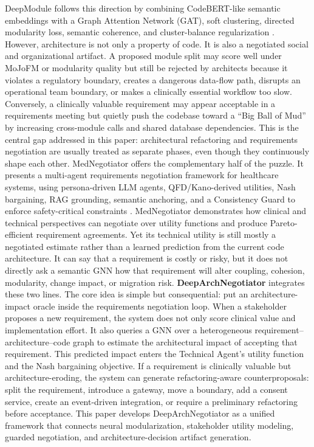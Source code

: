 \documentclass[english,preprint,nonatbib]{elsarticle}
\begin{document}
DeepModule follows this direction by combining CodeBERT-like semantic embeddings with a Graph Attention Network (GAT), soft clustering, directed modularity loss, semantic coherence, and cluster-balance regularization \cite{tanhaei2026deepmodule}.
However, architecture is not only a property of code. It is also a negotiated social and organizational artifact.
A proposed module split may score well under MoJoFM or modularity quality but still be rejected by architects because it violates a regulatory boundary, creates a dangerous data-flow path, disrupts an operational team boundary, or makes a clinically essential workflow too slow.
Conversely, a clinically valuable requirement may appear acceptable in a requirements meeting but quietly push the codebase toward a ``Big Ball of Mud'' by increasing cross-module calls and shared database dependencies.
This is the central gap addressed in this paper: architectural refactoring and requirements negotiation are usually treated as separate phases, even though they continuously shape each other.
MedNegotiator offers the complementary half of the puzzle.
It presents a multi-agent requirements negotiation framework for healthcare systems, using persona-driven LLM agents, QFD/Kano-derived utilities, Nash bargaining, RAG grounding, semantic anchoring, and a Consistency Guard to enforce safety-critical constraints \cite{tanhaei2026mednegotiator}.
MedNegotiator demonstrates how clinical and technical perspectives can negotiate over utility functions and produce Pareto-efficient requirement agreements.
Yet its technical utility is still mostly a negotiated estimate rather than a learned prediction from the current code architecture.
It can say that a requirement is costly or risky, but it does not directly ask a semantic GNN how that requirement will alter coupling, cohesion, modularity, change impact, or migration risk.
\textbf{DeepArchNegotiator} integrates these two lines. The core idea is simple but consequential: put an architecture-impact oracle inside the requirements negotiation loop.
When a stakeholder proposes a new requirement, the system does not only score clinical value and implementation effort.
It also queries a GNN over a heterogeneous requirement--architecture--code graph to estimate the architectural impact of accepting that requirement.
This predicted impact enters the Technical Agent's utility function and the Nash bargaining objective.
If a requirement is clinically valuable but architecture-eroding, the system can generate refactoring-aware counterproposals: split the requirement, introduce a gateway, move a boundary, add a consent service, create an event-driven integration, or require a preliminary refactoring before acceptance.
This paper develops DeepArchNegotiator as a unified framework that connects neural modularization, stakeholder utility modeling, guarded negotiation, and architecture-decision artifact generation.
\end{document}
